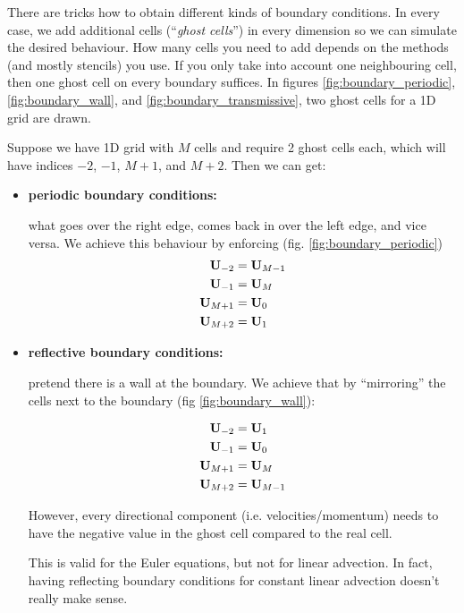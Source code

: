 There are tricks how to obtain different kinds of boundary conditions.
In every case, we add additional cells (``\emph{ghost cells}'') in every dimension so we can simulate the desired behaviour.
How many cells you need to add depends on the methods (and mostly stencils) you use.
If you only take into account one neighbouring cell, then one ghost cell on every boundary suffices.
In figures \ref{fig:boundary_periodic}, \ref{fig:boundary_wall}, and \ref{fig:boundary_transmissive}, two ghost cells for a 1D grid are drawn.


Suppose we have 1D grid with $M$ cells and require 2 ghost cells each, which will have indices $-2$, $-1$, $M+1$, and $M+2$.
Then we can get:

\begin{itemize}
	\item \textbf{periodic boundary conditions:}
	
		what goes over the right edge, comes back in over the left edge, and vice versa.
		We achieve this behaviour by enforcing (fig. \ref{fig:boundary_periodic})
		\begin{align*}
			\mathbf{U}_{-2} &= \mathbf{U}_{M-1} \\
			\mathbf{U}_{-1} &= \mathbf{U}_{M}	\\
			\mathbf{U}_{M+1} &= \mathbf{U}_0 	\\
			\mathbf{U}_{M+2} &= \mathbf{U}_1 	\\
		\end{align*}
		
		
		
	\item \textbf{reflective boundary conditions:}
	
		pretend there is a wall at the boundary. 
		We achieve that by ``mirroring'' the cells next to the boundary (fig \ref{fig:boundary_wall}):

		\begin{align*}
			\mathbf{U}_{-2} &= \mathbf{U}_1		\\
			\mathbf{U}_{-1} &= \mathbf{U}_0		\\
			\mathbf{U}_{M+1} &= \mathbf{U}_{M}	\\
			\mathbf{U}_{M+2} &= \mathbf{U}_{M-1}\\
		\end{align*}
		
		However, every directional component (i.e. velocities/momentum) needs to have the negative value in the ghost cell compared to the real cell.
		
		This is valid for the Euler equations, but not for linear advection.
		In fact, having reflecting boundary conditions for constant linear advection doesn't really make sense.
	

\end{itemize}
